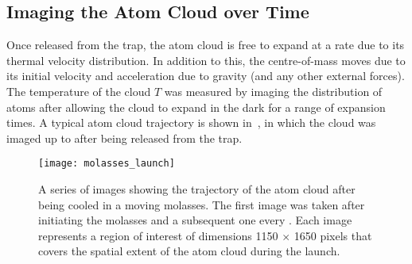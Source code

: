 \subsection{Imaging the Atom Cloud over Time}\label{subsec:molasses_imaging}
Once released from the trap, the atom cloud is free to expand at a
rate due to its
thermal velocity distribution. In addition to this, the centre-of-mass
moves due to its initial velocity and acceleration due to gravity
(and any other external forces).
The temperature of the cloud $T$ was measured by imaging the
distribution of atoms after allowing the cloud to expand in the dark
for a range of expansion times. A typical atom cloud trajectory is
shown in~, in which the cloud was imaged
up to  after being released from the trap.

\begin{figure}[!htbp]
    \centering
    \texttt{[image: molasses\_launch]}
    \caption[Atom cloud position after launching in a moving molasses]{A series of images showing the trajectory of the atom cloud after being cooled in a moving molasses. The first image was taken  after initiating the molasses and a subsequent one every . Each image represents a region of interest of dimensions 1150 \(\times\) 1650 pixels that covers the spatial extent of the atom cloud during the launch.}
    \label{fig:molasses_launch}
\end{figure}
